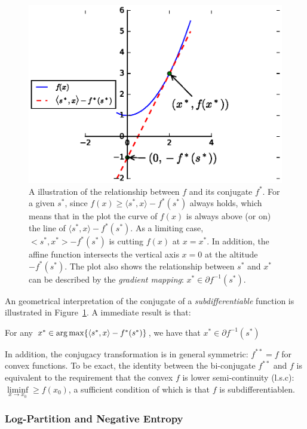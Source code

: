 \begin{figure}[h!]
  \centering
  \includegraphics[width=0.7\linewidth, trim={0 0 3cm 1.5cm},
                    clip]{figures/conjugate-function.eps}

  \caption{A illustration of the relationship between $f$ and its conjugate
    $f^*$. For a given $s^*$, since $f(x) \geq \langle s^*, x \rangle  -
    f^*(s^*)$ always holds, which means that in the plot the curve of $f(x)$ is
    always above (or on) the line of $\langle s^*, x \rangle  - f^*(s^*)$. As a
    limiting case, $<s^*, x^*> - f^*(s^*)$ is cutting $f(x)$ at $x = x^*$. In
    addition, the affine function intersects the vertical axis $x = 0$ at the
    altitude $-f^*(s^*)$. The plot also shows the relationship between $s^*$ and
    $x^*$ can be described by the \emph{gradient mapping}: $x^* \in \partial
    f^{-1}(s^*)$.}

  \label{fig::conjugate-function}
\end{figure}

An geometrical interpretation of the conjugate of a \emph{subdifferentiable}
function is illustrated in Figure~\ref{fig::conjugate-function}. A immediate
result is that:

\begin{thm} \label{thm::conjugate-attainer}
For any $x^* \in \operatorname*{arg\,max} \{ \langle s^*, x \rangle  - f^*(s^*)
\}$, we have that $x^* \in \partial f^{-1}(s^*)$
\end{thm}

In addition, the conjugacy transformation is in general symmetric: $f^{**} = f$
for convex functions. To be exact, the identity between the bi-conjugate
$f^{**}$ and $f$ is equivalent to the requirement that the convex $f$ is
lower semi-continuity (l.s.c): $\liminf\limits_{x \rightarrow x_0} \geq f(x_0)$,
a sufficient condition of which is that $f$ is subdifferentiablen.

\subsubsection{Log-Partition and Negative Entropy}

